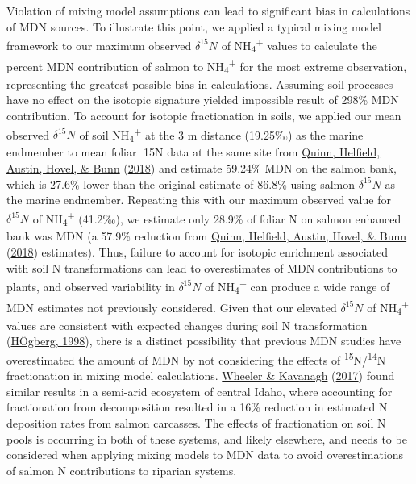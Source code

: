 \documentclass [11pt, proquest] {uwthesis}[2015/03/03]
\begin{document}
Violation of mixing model assumptions can lead to significant bias in calculations of MDN sources. To illustrate this point, we applied a typical mixing model framework to our maximum observed \(\delta^{15}N\) of NH\textsubscript{4}\textsuperscript{+} values to calculate the percent MDN contribution of salmon to NH\textsubscript{4}\textsuperscript{+} for the most extreme observation, representing the greatest possible bias in calculations. Assuming soil processes have no effect on the isotopic signature yielded impossible result of 298\% MDN contribution. To account for isotopic fractionation in soils, we applied our mean observed \(\delta^{15}N\) of soil NH\textsubscript{4}\textsuperscript{+} at the 3 m distance (19.25‰) as the marine endmember to mean foliar 15N data at the same site from \protect\hyperlink{ref-Quinn2018}{Quinn, Helfield, Austin, Hovel, \& Bunn} (\protect\hyperlink{ref-Quinn2018}{2018}) and estimate 59.24\% MDN on the salmon bank, which is 27.6\% lower than the original estimate of 86.8\% using salmon \(\delta^{15}N\) as the marine endmember. Repeating this with our maximum observed value for \(\delta^{15}N\) of NH\textsubscript{4}\textsuperscript{+} (41.2‰), we estimate only 28.9\% of foliar N on salmon enhanced bank was MDN (a 57.9\% reduction from \protect\hyperlink{ref-Quinn2018}{Quinn, Helfield, Austin, Hovel, \& Bunn} (\protect\hyperlink{ref-Quinn2018}{2018}) estimates). Thus, failure to account for isotopic enrichment associated with soil N transformations can lead to overestimates of MDN contributions to plants, and observed variability in \(\delta^{15}N\) of NH\textsubscript{4}\textsuperscript{+} can produce a wide range of MDN estimates not previously considered. Given that our elevated \(\delta^{15}N\) of NH\textsubscript{4}\textsuperscript{+} values are consistent with expected changes during soil N transformation (\protect\hyperlink{ref-Hogberg1998}{HÖgberg, 1998}), there is a distinct possibility that previous MDN studies have overestimated the amount of MDN by not considering the effects of \textsuperscript{15}N/\textsuperscript{14}N fractionation in mixing model calculations. \protect\hyperlink{ref-Wheeler2017}{Wheeler \& Kavanagh} (\protect\hyperlink{ref-Wheeler2017}{2017}) found similar results in a semi-arid ecosystem of central Idaho, where accounting for fractionation from decomposition resulted in a 16\% reduction in estimated N deposition rates from salmon carcasses. The effects of fractionation on soil N pools is occurring in both of these systems, and likely elsewhere, and needs to be considered when applying mixing models to MDN data to avoid overestimations of salmon N contributions to riparian systems.
\end{document}
